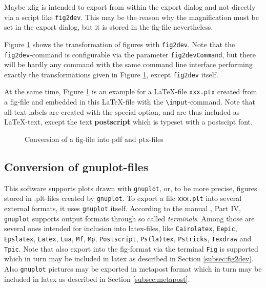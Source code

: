 \documentclass[12pt]{article}
\begin{document}
Maybe xfig is intended to export from within the export dialog 
and not directly via a script like {\tt fig2dev}. 
This may be the reason 
why the magnification must be set in the export dialog, 
but it is stored in the fig-file nevertheless. 

Figure \ref{fig:fig2dev} shows the transformation 
of figures with {\tt fig2dev}. 
Note that the {\tt fig2dev}-command is configurable 
via the parameter {\tt fig2devCommand}, 
but there will be hardly any command with the same command line interface 
performing exactly the transformations given in Figure \ref{fig:fig2dev}, 
except {\tt fig2dev} itself. 

At the same time, Figure \ref{fig:fig2dev} is an example 
for a \LaTeX-file {\tt xxx.ptx} created from a fig-file 
and embedded in this \LaTeX-file 
with the {\tt\textbackslash input}-command. 
Note that all text labels are created with the special-option, 
and are thus included as \LaTeX-text, 
except the text {\bf\tiny postscript} 
which is typeset with a postscipt font. 


\begin{figure}[htb]
\begin{center}

\end{center}
\caption{\label{fig:fig2dev}Conversion of a fig-file into pdf and ptx-files}
\end{figure}


\subsection{Conversion of gnuplot-files}\label{subsec:gnuplot2pdf}

This software supports plots drawn with {\tt gnuplot}, or, to be more precise, 
figures stored in .plt-files created by {\tt gnuplot}. 
To export a file {\tt xxx.plt} into several external formats, 
it uses {\tt gnuplot} itself. 
According to the manual \cite{GnuPlot}, Part IV, 
{\tt gnuplot} supports output formats through so called {\em terminals}. 
Among those are several ones intended for inclusion into latex-files, 
like {\tt Cairolatex}, {\tt Eepic}, {\tt Epslatex}, {\tt Latex}, {\tt Lua}, 
{\tt Mf}, {\tt Mp}, {\tt Postscript}, {\tt Ps(la)tex}, {\tt Pstricks}, 
{\tt Texdraw} and {\tt Tpic}. 
Note that also export into the fig-format via the terminal {\tt Fig} 
is supported which in turn may be included in latex 
as described in Section \ref{subsec:fig2dev}. 
Also {\tt gnuplot} pictures may be exported in metapost format 
which in turn may be included in latex 
as described in Section \ref{subsec:metapost}. 
\end{document}
